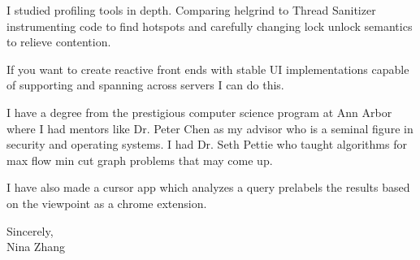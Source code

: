 \documentclass[11pt,a4paper]{article}
\begin{document}
\vspace{0.2in}

I studied profiling tools in depth. Comparing helgrind to Thread Sanitizer instrumenting code to find hotspots and carefully changing lock unlock semantics to relieve contention.

\vspace{0.2in}

If you want to create reactive front ends with stable UI implementations capable of supporting and spanning across servers I can do this.

\vspace{0.2in}

I have a degree from the prestigious computer science program at Ann Arbor where I had mentors like Dr. Peter Chen as my advisor who is a seminal figure in security and operating systems. I had Dr. Seth Pettie who taught algorithms for max flow min cut graph problems that may come up.

\vspace{0.2in}

I have also made a cursor app which analyzes a query prelabels the results based on the viewpoint as a chrome extension.

\vspace{0.5in}

Sincerely,\\
Nina Zhang
\end{document}
